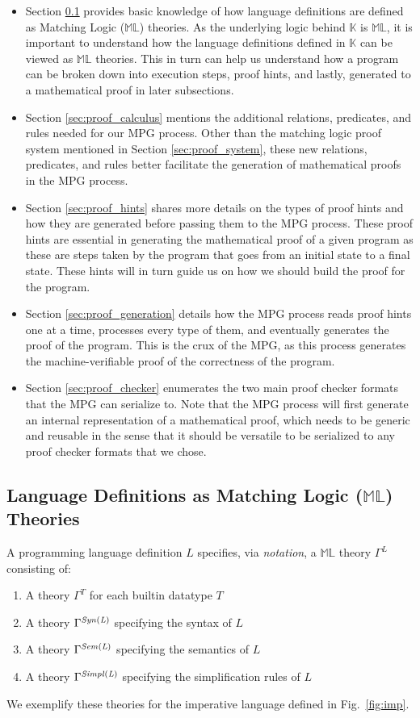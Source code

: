 \documentclass{article}
\theoremstyle{plain}
\theoremstyle{definition}
\newcommand{\K}{$\mathbb{K}$\xspace}
\newcommand{\ML}{$\mathbb{ML}$\xspace}
\begin{document}
\begin{itemize}
    \item Section \ref{sec:langdef_as_ml} provides basic knowledge of how language definitions are defined as Matching Logic (\ML) theories. As the underlying logic behind \K is \ML, it is important to understand how the language definitions defined in \K can be viewed as \ML theories. This in turn can help us understand how a program can be broken down into execution steps, proof hints, and lastly, generated to a mathematical proof in later subsections.
    \item Section \ref{sec:proof_calculus} mentions the additional relations, predicates, and rules needed for our MPG process. Other than the matching logic proof system mentioned in Section \ref{sec:proof_system}, these new relations, predicates, and rules better facilitate the generation of mathematical proofs in the MPG process.
    \item Section \ref{sec:proof_hints} shares more details on the types of proof hints and how they are generated before passing them to the MPG process. These proof hints are essential in generating the mathematical proof of a given program as these are steps taken by the program that goes from an initial state to a final state. These hints will in turn guide us on how we should build the proof for the program.
    \item Section \ref{sec:proof_generation} details how the MPG process reads proof hints one at a time, processes every type of them, and eventually generates the proof of the program. This is the crux of the MPG, as this process generates the machine-verifiable proof of the correctness of the program.
    \item Section \ref{sec:proof_checker} enumerates the two main proof checker formats that the MPG can serialize to. Note that the MPG process will first generate an internal representation of a mathematical proof, which needs to be generic and reusable in the sense that it should be versatile to be serialized to any proof checker formats that we chose.
\end{itemize}


\subsection{Language Definitions as Matching Logic (\ML) Theories} \label{sec:langdef_as_ml}

A programming language definition $L$ specifies, via \emph{notation}, a \ML theory $\Gamma^L$ consisting of:
\begin{enumerate}
\item 
A theory $\Gamma^T$ for each builtin datatype $T$
\item 
A theory $\Gamma^{\it Syn(L)}$ specifying the syntax of $L$
\item 
A theory $\Gamma^{\it Sem(L)}$ specifying the semantics of $L$
\item 
A theory $\Gamma^{\it Simpl(L)}$ specifying the simplification rules of $L$
\end{enumerate}
We exemplify these theories for the imperative language defined in Fig.~\ref{fig:imp}.
\end{document}
